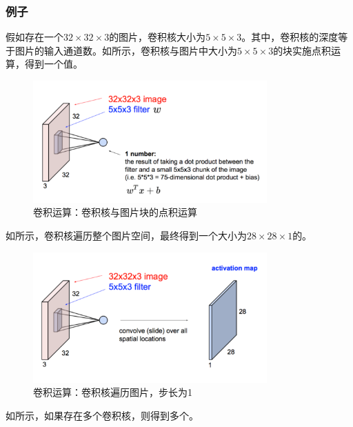 \begin{content}
\begin{content}
\subsubsection{例子}

假如存在一个$32 \times 32 \times 3$的图片，卷积核大小为$5 \times 5 \times 3$。其中，卷积核的深度等于图片的输入通道数。如所示，卷积核与图片中大小为$5 \times 5 \times 3$的块实施点积运算，得到一个值。

\begin{figure}[H]
\centering
\includegraphics[width=0.8\textwidth]{figures/convolutional-layer-2.png}
\caption{卷积运算：卷积核与图片块的点积运算}
 \label{fig:mnist-conv-1dot}
\end{figure}

如所示，卷积核遍历整个图片空间，最终得到一个大小为$28 \times 28 \times 1$的。

\begin{figure}[H]
\centering
\includegraphics[width=0.8\textwidth]{figures/convolutional-layer-3.png}
\caption{卷积运算：卷积核遍历图片，步长为1}
 \label{fig:mnist-conv-ndot}
\end{figure}

如所示，如果存在多个卷积核，则得到多个。


\end{content}
\end{content}
